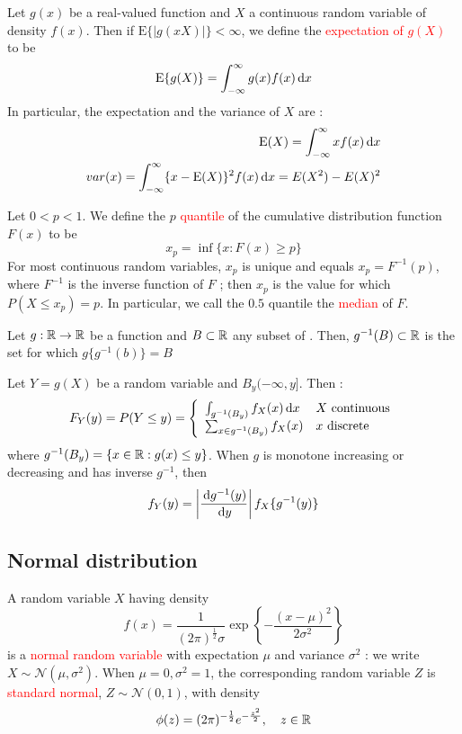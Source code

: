 \documentclass[12pt,a4paper]{article}
\newcommand{\E}{\ensuremath{\mathrm{E}}}
\begin{document}
 Let $g(x)$ be a real-valued function and $X$ a continuous random variable of density $f(x)$. Then if $\E\{|g(xX)|\} < \infty$, we define the \textcolor{red}{expectation of $g(X)$} to be 
\begin{equation}
    \E\{g(X)\} = \int_{-\infty}^{\infty} g(x)f(x) \deriv{x}
\end{equation}
In particular, the expectation and the variance of $X$ are :
\begin{align}
    \E(X) = \int_{-\infty}^{\infty} x f(x) \deriv{x}\\
    var(x) = \int_{-\infty}^{\infty}\{x - \E(X)\}^2 f(x)\deriv{x} = E(X^2) - E(X)^2
\end{align}

 Let $0 < p <1$. We define the $p$ \textcolor{red}{quantile} of the cumulative distribution function $F(x)$ to be 
\begin{equation}
    x_p = \inf\{x: F(x) \geq p\}
\end{equation}
For most continuous random variables, $x_p$ is unique and equals $x_p = F^{-1}(p)$, where $F^{-1}$ is the inverse function of $F$ ; then $x_p$ is the value for which $P(X \leq x_p) = p$. In particular, we call the $0.5$ quantile the \textcolor{red}{median} of $F$.

 Let $g: \mathbb{R} \to \mathbb{R}$ be a function and $B \subset \mathbb{R}$ any subset of \R. Then, $g^{-1}(B) \subset \mathbb{R}$ is the set for which $g\{g^{-1}(b)\} = B$

 Let $Y = g(X)$ be a random variable and $B_y  (-\infty, y]$. Then :
\begin{equation}
    F_Y(y) = P(Y \leq y) = 
    \left\{\begin{array}{ll}
        \int_{g^{-1}(B_y)}f_X(x)\, \mathrm d x & X \text{ continuous}\\
        \sum_{x\in g^{-1} (B_y)}f_X(x) & x \text{ discrete}
    \end{array}\right.
\end{equation}
where $g^{-1}(B_y) = \{x \in \mathbb{R} : g(x) \leq y\}$. When $g$ is monotone increasing or decreasing and has inverse $g^{-1}$, then
\begin{equation}
    f_Y(y) = \left|\frac{\, \mathrm d g^{-1}(y)}{\, \mathrm d y}\right| f_X\{g^{-1}(y)\}
\end{equation}

\subsection*{Normal distribution}
 A random variable $X$ having density
\[f(x)= \frac{1}{(2\pi)^{\frac{1}{2}}\sigma} \exp\left\{-\frac{(x-\mu)^2}{2\sigma^2}\right\}\]
is a \textcolor{red}{normal random variable} with expectation $\mu$ and variance $\sigma^2$ : we write $X \sim \mathcal{N}(\mu, \sigma^2)$. When $\mu = 0, \sigma^2 = 1$, the corresponding random variable $Z$ is \textcolor{red}{standard normal}, $Z \sim \mathcal{N}(0,1)$, with density 
\[\phi(z) = (2\pi)^{-\frac{1}{2}}e^{-\frac{z^2}{2}},\quad z \in \mathbb{R}\]
\end{document}
